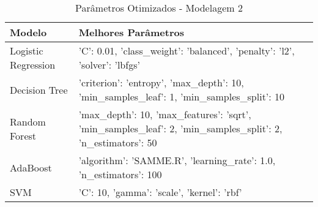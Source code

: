 \begin{table}[H] %
    \centering
    \caption{Parâmetros Otimizados - Modelagem 2}
    \label{tab:melhores_parametros_modelagem_2}
    \renewcommand{\arraystretch}{1.25} %
    \begin{adjustwidth}{ -1in }{ -1in } %
    \centering %
    \small %
    \begin{tabular}{ll}
\toprule
             Modelo &                                                                                          Melhores Parâmetros \\
\midrule
Logistic Regression &                                  {'C': 0.01, 'class_weight': 'balanced', 'penalty': 'l2', 'solver': 'lbfgs'} \\
      Decision Tree &                    {'criterion': 'entropy', 'max_depth': 10, 'min_samples_leaf': 1, 'min_samples_split': 10} \\
      Random Forest & {'max_depth': 10, 'max_features': 'sqrt', 'min_samples_leaf': 2, 'min_samples_split': 2, 'n_estimators': 50} \\
           AdaBoost &                                          {'algorithm': 'SAMME.R', 'learning_rate': 1.0, 'n_estimators': 100} \\
                SVM &                                                                 {'C': 10, 'gamma': 'scale', 'kernel': 'rbf'} \\
\bottomrule
\end{tabular}
    \end{adjustwidth}
    \renewcommand{\arraystretch}{1.0} %
\end{table}
